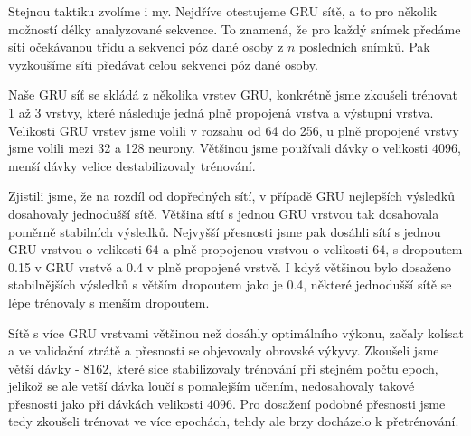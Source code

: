 Stejnou taktiku zvolíme i my. Nejdříve otestujeme GRU sítě, a to pro několik
možností délky analyzované sekvence. To znamená, že pro každý snímek předáme
síti očekávanou třídu a sekvenci póz dané osoby z $n$ posledních snímků. Pak
vyzkoušíme síti předávat celou sekvenci póz dané osoby.

Naše GRU síť se skládá z několika vrstev GRU, konkrétně jsme zkoušeli trénovat
1 až 3 vrstvy, které následuje jedná plně propojená vrstva a výstupní vrstva.
Velikosti GRU vrstev jsme volili v rozsahu od 64 do 256, u plně propojené
vrstvy jsme volili mezi 32 a 128 neurony. Většinou jsme používali dávky o
velikosti $4096$, menší dávky velice destabilizovaly trénování.

Zjistili jsme, že na rozdíl od dopředných sítí, v případě GRU nejlepších
výsledků dosahovaly jednodušší sítě. Většina sítí s jednou GRU vrstvou tak
dosahovala poměrně stabilních výsledků. Nejvyšší přesnosti jsme pak dosáhli
sítí s jednou GRU vrstvou o velikosti $64$ a plně propojenou vrstvou o
velikosti $64$, s dropoutem 0.15 v GRU vrstvě a 0.4 v plně propojené vrstvě. I
když většinou bylo dosaženo stabilnějších výsledků s větším dropoutem jako je
0.4, některé jednodušší sítě se lépe trénovaly s menším dropoutem.

Sítě s více GRU vrstvami většinou než dosáhly optimálního výkonu, začaly
kolísat a ve validační ztrátě a přesnosti se objevovaly obrovské výkyvy.
Zkoušeli jsme větší dávky - $8162$, které sice stabilizovaly trénování při
stejném počtu epoch, jelikož se ale vetší dávka loučí s pomalejším učením,
nedosahovaly takové přesnosti jako při dávkách velikosti $4096$. Pro dosažení
podobné přesnosti jsme tedy zkoušeli trénovat ve více epochách, tehdy ale brzy
docházelo k přetrénování.



%
%
%
%
%
%
%
%
%
%
%
%
%
%
%
%



